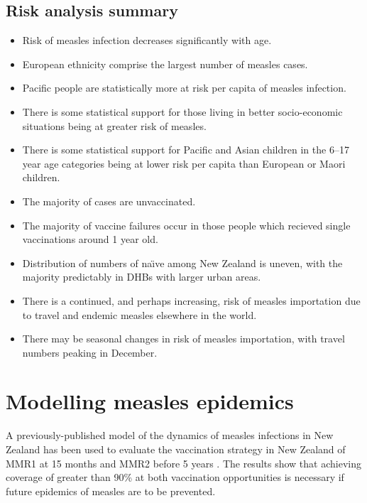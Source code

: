 \documentclass{article}
\begin{document}
\subsection{Risk analysis summary}
\begin{itemize}
\item Risk of measles infection decreases significantly with age.
\item European ethnicity comprise the largest number of measles cases.
\item Pacific people are statistically more at risk per capita of measles infection.
\item There is some statistical support for those living in better socio-economic situations being at greater risk of measles.
\item There is some statistical support for Pacific and Asian children in the 6--17 year age categories being at lower risk per capita than European or Maori children.
\item The majority of cases are unvaccinated.
\item The majority of vaccine failures occur in those people which recieved single vaccinations around 1 year old.
\item Distribution of numbers of na\"{\i}ve among New Zealand is uneven, with the majority predictably in DHBs with larger urban areas.
\item There is a continued, and perhaps increasing, risk of measles importation due to travel and endemic measles elsewhere in the world.
\item There may be seasonal changes in risk of measles importation, with travel numbers peaking in December.
\end{itemize}

\section{Modelling measles epidemics}
\label{section:epidemic_modelling}

A previously-published model of the dynamics of measles infections in New Zealand has been used to evaluate the vaccination strategy in New Zealand of MMR1 at 15 months and MMR2 before 5 years \citep{roberts0,roberts4,tobias98}. The results show that achieving coverage of greater than 90\% at both vaccination opportunities is necessary if future epidemics of measles are to be prevented.
\end{document}

